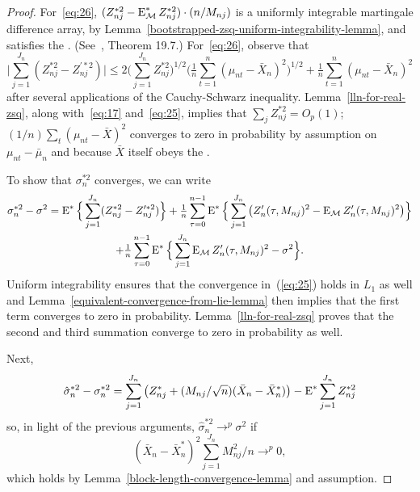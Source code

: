 \documentclass[11pt]{article}
\begin{document}
\begin{proof}
  For~\eqref{eq:26}, $(Z_{nj}^{*2} - \operatorname{E}_{\mathcal{M}}^* Z_{nj}^{*2}) \cdot (n /
  M_{nj})$ is a uniformly integrable martingale difference array, by
  Lemma~\ref{bootstrapped-zsq-uniform-integrability-lemma}, and
  satisfies the \lln. (See~\citealp{Dav:94}, Theorem 19.7.)
  For~\eqref{eq:26}, observe that
  \begin{equation*}
    \Big| \sum_{j=1}^{J_n} (Z_{nj}^{*2} - Z_{nj}^{\prime*2}) \Big| \leq
    2 \Big(\sum_{j=1}^{J_n} Z_{nj}^{*2} \Big)^{1/2}
    \Big(\tfrac{1}{n} \sum_{t=1}^n (\mu_{nt} - \bar X_n)^2\Big)^{1/2}
    + \tfrac{1}{n} \sum_{t=1}^n (\mu_{nt} - \bar X_n)^2
  \end{equation*}
  after several applications of the Cauchy-Schwarz
  inequality. Lemma~\ref{lln-for-real-zsq}, along with~\eqref{eq:17}
  and~\eqref{eq:25}, implies that $\sum_j Z_{nj}^{*2} = O_p(1)$;
  $(1/n) \sum_t (\mu_{nt} - \bar X)^2$ converges to zero in
  probability by assumption on $\mu_{nt} - \bar\mu_n$ and because
  $\bar X$ itself obeys the \lln.

  To show that $\sigma_n^{*2}$ converges, we can write
  \begin{multline*}
    \sigma_n^{*2} - \sigma^2 = \operatorname{E}^*\Big\{ \sum_{j=1}^{J_n} (Z_{nj}^{*2} - Z_{nj}^{\prime*2}) \Big\}
    + \tfrac{1}{n} \sum_{\tau=0}^{n-1} \operatorname{E}^* \Big\{\sum_{j=1}^{J_n}
    \big( Z_{n}^{\prime}(\tau,M_{nj})^2 - \operatorname{E}_{\mathcal{M}} Z_{n}^{\prime}(\tau,M_{nj})^2 \big)\Big\} \\
    + \tfrac{1}{n} \sum_{\tau=0}^{n-1} \operatorname{E}^* \Big\{\sum_{j=1}^{J_n}
    \operatorname{E}_{\mathcal{M}} Z_{n}^{\prime}(\tau,M_{nj})^2  - \sigma^2\Big\}.
  \end{multline*}
  Uniform integrability ensures that the convergence in~(\ref{eq:25})
  holds in $L_1$ as well and
  Lemma~\ref{equivalent-convergence-from-lie-lemma} then implies that
  the first term converges to zero in probability.
  Lemma~\ref{lln-for-real-zsq} proves that the second and third
  summation converge to zero in probability as well.

  Next,
  \begin{equation*}
    \hat \sigma_n^{*2} - \sigma_n^{*2}
    = \sum_{j=1}^{J_n} \big( Z_{nj}^* + (M_{nj}/\sqrt{n}) (\bar X_n - \bar X_{n}^*) \big)
    - \operatorname{E}^*  \sum_{j=1}^{J_n} Z_{nj}^{*2}
  \end{equation*}
  so, in light of the previous arguments, $\hat\sigma_n^{*2} \to^p \sigma^2$ if
  \begin{equation}
    (\bar X_n - \bar X_n^*)^2 \sum_{j=1}^{J_n} M_{nj}^2/n \to^p 0,
  \end{equation}
  which holds by Lemma~\ref{block-length-convergence-lemma} and
  assumption.
\end{proof}
\end{document}
